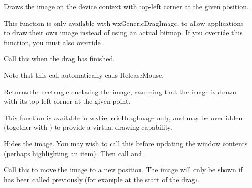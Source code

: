 
\label{wxdragimagedodrawimage}


Draws the image on the device context with top-left corner at the given position.

This function is only available with wxGenericDragImage, to allow applications to
draw their own image instead of using an actual bitmap. If you override this function,
you must also override .

\label{wxdragimageenddrag}


Call this when the drag has finished.

Note that this call automatically calls ReleaseMouse.

\label{wxdragimagegetimagerect}


Returns the rectangle enclosing the image, assuming that the image is drawn with its
top-left corner at the given point.

This function is available in wxGenericDragImage only, and may be overridden (together with 
) to provide a virtual drawing capability.

\label{wxdragimagehide}


Hides the image. You may wish to call this before updating the window
contents (perhaps highlighting an item). Then call  
and .

\label{wxdragimagemove}


Call this to move the image to a new position. The image will only be shown if 
 has been called previously (for example
at the start of the drag).

